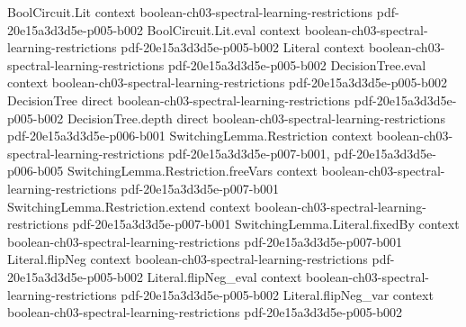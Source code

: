 \begin{theorem}
\label{RestrictionFourier.fourierCoeff_restrictBF}
\leanok
{}
\proofstep
  {BoolCircuit.Lit}
  {context}
  {boolean-ch03-spectral-learning-restrictions}
  {pdf-20e15a3d3d5e-p005-b002}
\proofstep
  {BoolCircuit.Lit.eval}
  {context}
  {boolean-ch03-spectral-learning-restrictions}
  {pdf-20e15a3d3d5e-p005-b002}
\proofstep
  {Literal}
  {context}
  {boolean-ch03-spectral-learning-restrictions}
  {pdf-20e15a3d3d5e-p005-b002}
\proofstep
  {DecisionTree.eval}
  {context}
  {boolean-ch03-spectral-learning-restrictions}
  {pdf-20e15a3d3d5e-p005-b002}
\proofstep
  {DecisionTree}
  {direct}
  {boolean-ch03-spectral-learning-restrictions}
  {pdf-20e15a3d3d5e-p005-b002}
\proofstep
  {DecisionTree.depth}
  {direct}
  {boolean-ch03-spectral-learning-restrictions}
  {pdf-20e15a3d3d5e-p006-b001}
\proofstep
  {SwitchingLemma.Restriction}
  {context}
  {boolean-ch03-spectral-learning-restrictions}
  {pdf-20e15a3d3d5e-p007-b001,
    pdf-20e15a3d3d5e-p006-b005}
\proofstep
  {SwitchingLemma.Restriction.freeVars}
  {context}
  {boolean-ch03-spectral-learning-restrictions}
  {pdf-20e15a3d3d5e-p007-b001}
\proofstep
  {SwitchingLemma.Restriction.extend}
  {context}
  {boolean-ch03-spectral-learning-restrictions}
  {pdf-20e15a3d3d5e-p007-b001}
\proofstep
  {SwitchingLemma.Literal.fixedBy}
  {context}
  {boolean-ch03-spectral-learning-restrictions}
  {pdf-20e15a3d3d5e-p007-b001}
\proofstep
  {Literal.flipNeg}
  {context}
  {boolean-ch03-spectral-learning-restrictions}
  {pdf-20e15a3d3d5e-p005-b002}
\proofstep
  {Literal.flipNeg_eval}
  {context}
  {boolean-ch03-spectral-learning-restrictions}
  {pdf-20e15a3d3d5e-p005-b002}
\proofstep
  {Literal.flipNeg_var}
  {context}
  {boolean-ch03-spectral-learning-restrictions}
  {pdf-20e15a3d3d5e-p005-b002}

\end{theorem}
